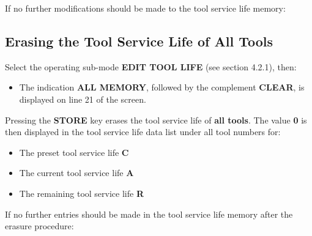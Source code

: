 If no further modifications should be made to the tool service life memory:

\marginnoteicon{11.0cm}{}
\begin{itemize}
\end{itemize}

\newpage

\subsection{Erasing the Tool Service Life of All Tools}

Select the operating sub-mode \textbf{EDIT TOOL LIFE} (see section 4.2.1), then:

\begin{itemize}
\end{itemize}
\vspace{.5cm}
\begin{itemize}
\end{itemize}
\vspace{.5cm}
\begin{itemize}
    \item The indication \textbf{ALL MEMORY}, followed by the complement \textbf{CLEAR}, is displayed on line 21 of the screen.

\end{itemize}

\vspace{.5cm}

Pressing the \textbf{STORE} key erases the tool service life of \textbf{all tools}.  
The value \textbf{0} is then displayed in the tool service life data list under all tool numbers for:  

\begin{itemize}
    \item The preset tool service life \textbf{C}
    \item The current tool service life \textbf{A}
    \item The remaining tool service life \textbf{R}
\end{itemize}


If no further entries should be made in the tool service life memory after the erasure procedure:

\begin{itemize}
\end{itemize}


